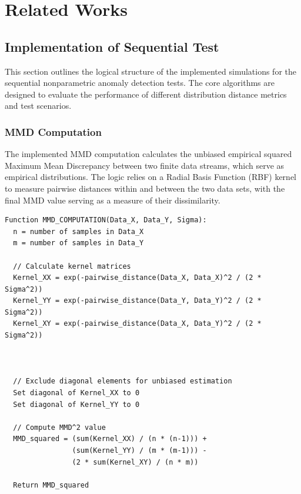 \chapter{Related Works}

\section{Implementation of Sequential Test \cite{sreenivasan2021sequential}}
This section outlines the logical structure of the implemented simulations for the sequential nonparametric anomaly detection tests. The core algorithms are designed to evaluate the performance of different distribution distance metrics and test scenarios.

\subsection{MMD Computation}
The implemented MMD computation calculates the unbiased empirical squared Maximum Mean Discrepancy between two finite data streams, which serve as empirical distributions. The logic relies on a Radial Basis Function (RBF) kernel to measure pairwise distances within and between the two data sets, with the final MMD value serving as a measure of their dissimilarity.
\begin{verbatim}
Function MMD_COMPUTATION(Data_X, Data_Y, Sigma):
  n = number of samples in Data_X
  m = number of samples in Data_Y
  
  // Calculate kernel matrices
  Kernel_XX = exp(-pairwise_distance(Data_X, Data_X)^2 / (2 * Sigma^2))
  Kernel_YY = exp(-pairwise_distance(Data_Y, Data_Y)^2 / (2 * Sigma^2))
  Kernel_XY = exp(-pairwise_distance(Data_X, Data_Y)^2 / (2 * Sigma^2))


  
  // Exclude diagonal elements for unbiased estimation
  Set diagonal of Kernel_XX to 0
  Set diagonal of Kernel_YY to 0
  
  // Compute MMD^2 value
  MMD_squared = (sum(Kernel_XX) / (n * (n-1))) +
                (sum(Kernel_YY) / (m * (m-1))) -
                (2 * sum(Kernel_XY) / (n * m))
  
  Return MMD_squared
\end{verbatim}

